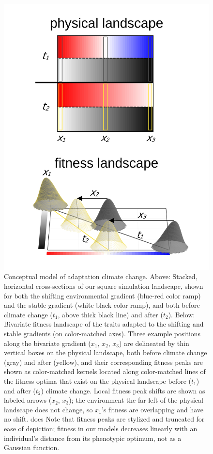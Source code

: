 \documentclass[9pt,twocolumn,twoside,lineno]{pnas-new}
\begin{document}
\begin{figure}%
\centering
\includegraphics[width=.8\linewidth]{conceptual_fig/ch2_conceptual_fig}
\caption{Conceptual model of adaptation climate change. Above: Stacked, horizontal cross-sections of our square simulation landscape, shown for both the shifting environmental gradient (blue-red color ramp) and the stable gradient (white-black color ramp), and both before climate change ($t_{1}$, above thick black line) and after ($t_{2}$). Below: Bivariate fitness landscape of the traits adapted to the shifting and stable gradients (on color-matched axes). Three example positions along the bivariate gradient ($x_{1}$, $x_{2}$, $x_{3}$) are delineated by thin vertical boxes on the physical landscape, both before climate change (gray) and after (yellow), and their corresponding fitness peaks are shown as color-matched kernels located along color-matched lines of the fitness optima that exist on the physical landscape before ($t_{1}$) and after ($t_{2}$) climate change. Local fitness peak shifts are shown as labeled arrows ($x_{2}$, $x_{3}$); the environment the far left of the physical landscape does not change, so $x_{1}$'s fitness are overlapping and have no shift. does Note that fitness peaks are stylized and truncated for ease of depiction; fitness in our models decreases linearly with an individual's distance from its phenotypic optimum, not as a Gaussian function.}
\label{fig:conceptual}
\end{figure}
\end{document}
